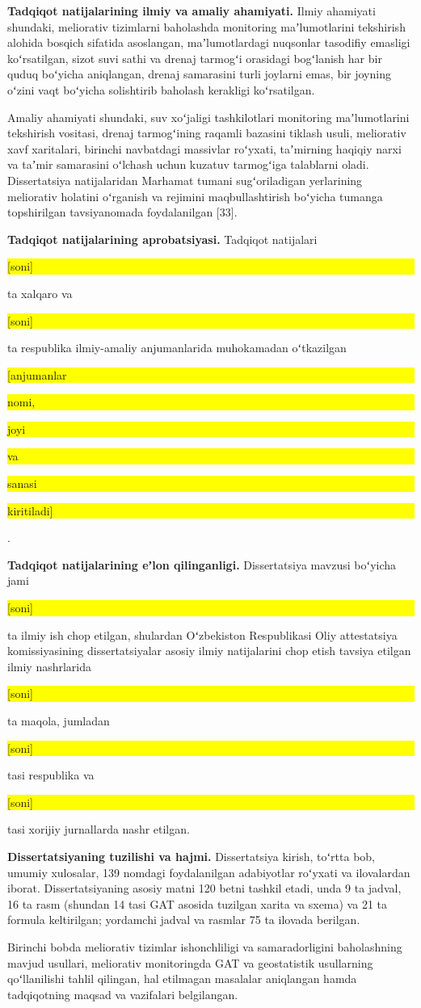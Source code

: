 \documentclass[14pt,a4paper,oneside]{extreport}
\newcommand{\toldir}[1]{\colorbox{yellow}{\strut #1}}
\begin{document}
\textbf{Tadqiqot natijalarining ilmiy va amaliy ahamiyati.} Ilmiy
ahamiyati shundaki, meliorativ tizimlarni baholashda monitoring
maʼlumotlarini tekshirish alohida bosqich sifatida asoslangan,
maʼlumotlardagi nuqsonlar tasodifiy emasligi koʻrsatilgan, sizot suvi
sathi va drenaj tarmogʻi orasidagi bogʻlanish har bir quduq boʻyicha
aniqlangan, drenaj samarasini turli joylarni emas, bir joyning oʻzini
vaqt boʻyicha solishtirib baholash kerakligi koʻrsatilgan.

Amaliy ahamiyati shundaki, suv xoʻjaligi tashkilotlari monitoring
maʼlumotlarini tekshirish vositasi, drenaj tarmogʻining raqamli bazasini
tiklash usuli, meliorativ xavf xaritalari, birinchi navbatdagi massivlar
roʻyxati, taʼmirning haqiqiy narxi va taʼmir samarasini oʻlchash uchun
kuzatuv tarmogʻiga talablarni oladi. Dissertatsiya natijalaridan
Marhamat tumani sugʻoriladigan yerlarining meliorativ holatini oʻrganish
va rejimini maqbullashtirish boʻyicha tumanga topshirilgan tavsiyanomada
foydalanilgan {[}33{]}.

\textbf{Tadqiqot natijalarining aprobatsiyasi.} Tadqiqot natijalari
\toldir{{[}soni{]}} ta xalqaro va \toldir{{[}soni{]}} ta respublika
ilmiy-amaliy anjumanlarida muhokamadan oʻtkazilgan
\toldir{{[}anjumanlar} \toldir{nomi,} \toldir{joyi} \toldir{va}
\toldir{sanasi} \toldir{kiritiladi{]}}.

\textbf{Tadqiqot natijalarining eʼlon qilinganligi.} Dissertatsiya
mavzusi boʻyicha jami \toldir{{[}soni{]}} ta ilmiy ish chop etilgan,
shulardan Oʻzbekiston Respublikasi Oliy attestatsiya komissiyasining
dissertatsiyalar asosiy ilmiy natijalarini chop etish tavsiya etilgan
ilmiy nashrlarida \toldir{{[}soni{]}} ta maqola, jumladan
\toldir{{[}soni{]}} tasi respublika va \toldir{{[}soni{]}} tasi xorijiy
jurnallarda nashr etilgan.

\textbf{Dissertatsiyaning tuzilishi va hajmi.} Dissertatsiya kirish,
toʻrtta bob, umumiy xulosalar, 139 nomdagi foydalanilgan adabiyotlar
roʻyxati va ilovalardan iborat. Dissertatsiyaning asosiy matni 120 betni
tashkil etadi, unda 9 ta jadval, 16 ta rasm (shundan 14 tasi GAT asosida
tuzilgan xarita va sxema) va 21 ta formula keltirilgan; yordamchi jadval
va rasmlar 75 ta ilovada berilgan.

Birinchi bobda meliorativ tizimlar ishonchliligi va samaradorligini
baholashning mavjud usullari, meliorativ monitoringda GAT va
geostatistik usullarning qoʻllanilishi tahlil qilingan, hal etilmagan
masalalar aniqlangan hamda tadqiqotning maqsad va vazifalari
belgilangan.
\end{document}
